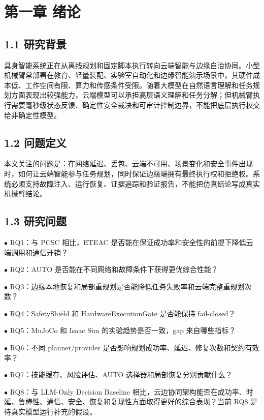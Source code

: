 \chapter{第一章 绪论}

\section{1.1 研究背景}

具身智能系统正在从离线规划和固定脚本执行转向云端智能与边缘自治协同。小型机械臂常部署在教育、轻量装配、实验室自动化和边缘智能演示场景中，其硬件成本低、工作空间有限、算力和传感条件受限。随着大模型在自然语言理解和任务规划方面表现出较强能力，云端模型可以承担高层语义理解和任务分解；但机械臂执行需要毫秒级状态反馈、确定性安全裁决和可审计控制边界，不能把底层执行权交给非确定性模型。\par

\section{1.2 问题定义}

本文关注的问题是：在网络延迟、丢包、云端不可用、场景变化和安全事件出现时，如何让云端智能参与任务规划，同时保证边缘端拥有最终执行权和拒绝权。系统必须支持故障注入、运行恢复、证据追踪和验证报告，不能把仿真结论写成真实机械臂结论。\par

\section{1.3 研究问题}

\noindent $\bullet$ RQ1：与 PCSC 相比，ETEAC 是否能在保证成功率和安全性的前提下降低云端调用和通信开销？\par
\noindent $\bullet$ RQ2：AUTO 是否能在不同网络和故障条件下获得更优综合性能？\par
\noindent $\bullet$ RQ3：边缘本地恢复和局部重规划是否能降低任务失败率和云端完整重规划次数？\par
\noindent $\bullet$ RQ4：SafetyShield 和 HardwareExecutionGate 是否能保持 fail-closed？\par
\noindent $\bullet$ RQ5：MuJoCo 和 Isaac Sim 的实验趋势是否一致，gap 来自哪些指标？\par
\noindent $\bullet$ RQ6：不同 planner/provider 是否影响规划成功率、延迟、修复次数和契约有效率？\par
\noindent $\bullet$ RQ7：技能缓存、风险评估、AUTO 选择器和局部恢复分别贡献什么？\par
\noindent $\bullet$ RQ8：与 LLM-Only Decision Baseline 相比，云边协同架构能否在成功率、时延、鲁棒性、通信、安全、恢复和复现性方面取得更好的综合表现？当前 RQ8 是待真实模型运行补充的假设。\par

